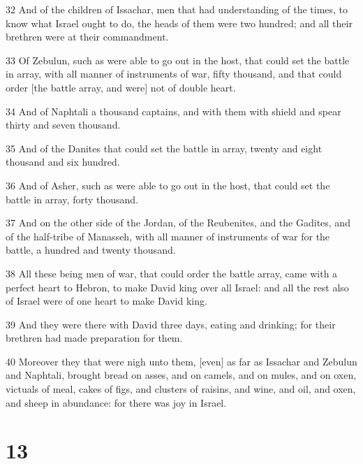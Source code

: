 \par 32 And of the children of Issachar, men that had understanding of the times, to know what Israel ought to do, the heads of them were two hundred; and all their brethren were at their commandment.
\par 33 Of Zebulun, such as were able to go out in the host, that could set the battle in array, with all manner of instruments of war, fifty thousand, and that could order [the battle array, and were] not of double heart.
\par 34 And of Naphtali a thousand captains, and with them with shield and spear thirty and seven thousand.
\par 35 And of the Danites that could set the battle in array, twenty and eight thousand and six hundred.
\par 36 And of Asher, such as were able to go out in the host, that could set the battle in array, forty thousand.
\par 37 And on the other side of the Jordan, of the Reubenites, and the Gadites, and of the half-tribe of Manasseh, with all manner of instruments of war for the battle, a hundred and twenty thousand.
\par 38 All these being men of war, that could order the battle array, came with a perfect heart to Hebron, to make David king over all Israel: and all the rest also of Israel were of one heart to make David king.
\par 39 And they were there with David three days, eating and drinking; for their brethren had made preparation for them.
\par 40 Moreover they that were nigh unto them, [even] as far as Issachar and Zebulun and Naphtali, brought bread on asses, and on camels, and on mules, and on oxen, victuals of meal, cakes of figs, and clusters of raisins, and wine, and oil, and oxen, and sheep in abundance: for there was joy in Israel.

\chapter{13}

